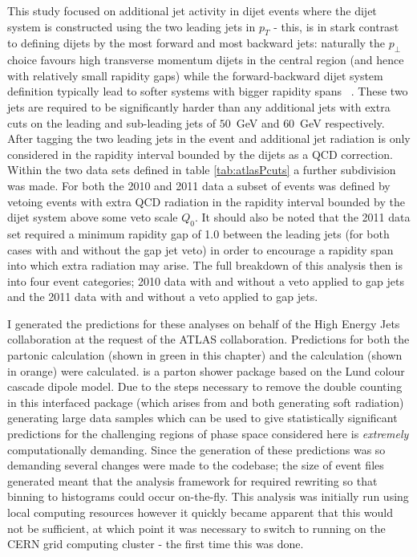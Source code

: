 	This study focused on additional jet activity in dijet events where the dijet system
	is constructed using the two leading jets in $p_T$ - this, is in stark contrast to
	defining dijets by the most forward and most backward jets: naturally the $p_\perp$
	choice favours high transverse momentum dijets in the central region (and hence with
	relatively small rapidity gaps) while the forward-backward dijet system definition
	typically lead to softer systems with bigger rapidity spans ~\cite{Abazov:2013gpa}.
	These two jets are required
	to be significantly harder than any additional jets with extra cuts on the leading
	and sub-leading jets of $50$~GeV and $60$~GeV respectively.  After tagging the two
	leading jets in the event and additional jet radiation is only considered in the rapidity
	interval bounded by the dijets as a QCD correction.  Within the two data sets
	defined in table \eqref{tab:atlasPcuts} a further subdivision was made.  For both the
	2010 and 2011 data a subset of events was defined by vetoing events with extra
	QCD radiation in the rapidity interval bounded by the dijet system above some veto
	scale $Q_0$.  It should also be noted that the 2011 data set required a minimum
	rapidity gap of 1.0 between the leading jets (for both cases with and without the gap jet
	veto) in order to encourage a rapidity span into which extra radiation may arise.
	The full breakdown of this analysis then is into four event categories;
	2010 data with and without a veto applied to gap jets and the 2011 data with and
	without a veto applied to gap jets.

	I generated the predictions for these analyses on behalf of the High Energy Jets
	collaboration at the request of the ATLAS collaboration. Predictions for both
	the partonic \HEJ calculation (shown in green in this chapter) and the \HEJA
	calculation (shown in orange) were calculated. \ARIADNE is a parton shower package
	based on the Lund colour cascade dipole model. Due to the steps necessary to remove the
	double counting in this interfaced package (which arises from \HEJ and \ARIADNE both
	generating soft radiation) generating large data samples which can be used to give
	statistically significant predictions for the challenging regions of phase space considered
	here is \emph{extremely} computationally demanding.  Since the generation of these
	predictions was so demanding several changes were made to the \HEJ codebase; the
	size of event files generated meant that the analysis framework for \hej required
	rewriting so that binning to histograms could occur on-the-fly.  This analysis was
	initially run using local computing resources however it quickly became apparent
	that this would not be sufficient, at which point it was necessary to switch to
	running \HEJ on the CERN grid computing cluster - the first time this was done.

